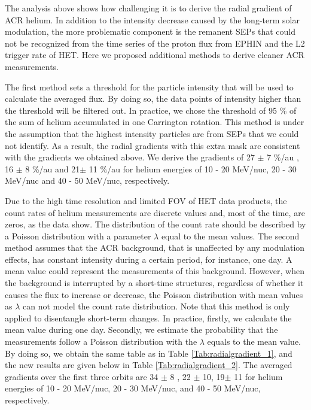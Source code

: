 The analysis above shows how challenging it is to derive the radial gradient of \ac{ACR} helium. In addition to the intensity decrease caused by the long-term solar modulation, the more problematic component is the remanent \acp{SEP} that could not be recognized from the time series of the proton flux from \ac{EPHIN} and the L2 trigger rate of \ac{HET}. Here we proposed additional methods to derive cleaner \ac{ACR} measurements.

The first method sets a threshold for the particle intensity that will be used to calculate the averaged flux. By doing so, the data points of intensity higher than the threshold will be filtered out. In practice, we chose the threshold of 95 \% of the sum of helium accumulated in one Carrington rotation. This method is under the assumption that the highest intensity particles are from \acp{SEP} that we could not identify. As a result, the radial gradients with this extra mask are consistent with the gradients we obtained above. We derive the gradients of 27 $\pm$ 7 \%/au , 16 $\pm$ 8 \%/au and 21$\pm$ 11 \%/au for helium energies of 10 - 20 MeV/nuc, 20 - 30 MeV/nuc and 40 - 50 MeV/nuc, respectively. 


Due to the high time resolution and limited \ac{FOV} of \ac{HET} data products, the count rates of helium measurements are discrete values and, most of the time, are zeros, as the data show. The distribution of the count rate should be described by a Poisson distribution with a parameter $\lambda$ equal to the mean values. 
The second method assumes that the \ac{ACR} background, that is unaffected by any modulation effects, has constant intensity during a certain period, for instance, one day. A mean value could represent the measurements of this background. However, when the background is interrupted by a short-time structures, regardless of whether it causes the flux to increase or decrease, the Poisson distribution with mean values as $\lambda$ can not model the count rate distribution. Note that this method is only applied to disentangle short-term changes. 
In practice, firstly, we calculate the mean value during one day. Secondly, we estimate the probability that the measurements follow a Poisson distribution with the $\lambda$ equals to the mean value.
By doing so, we obtain the same table as in Table \ref{Tab:radialgradient_1}, and the new results are given below in Table \ref{Tab:radialgradient_2}.
The averaged gradients over the first three orbits are 34 $\pm$ 8 , 22 $\pm$ 10, 19$\pm$ 11 for helium energies of 10 - 20 MeV/nuc, 20 - 30 MeV/nuc, and 40 - 50 MeV/nuc, respectively. 


